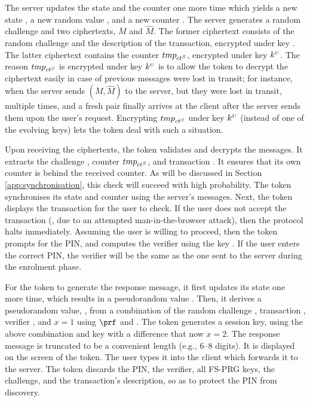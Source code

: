 The server updates the state and the counter one more time which yields a new state \VS{\state}, a new random value , and a new counter \VS{\counter}. The server generates a random challenge and two ciphertexts, $\ddot M$ and $\hat M$. The former ciphertext consists of the random challenge and the description of the transaction, encrypted under key . The latter ciphertext contains the counter ${tmp}_{{ct}^{\scriptscriptstyle S}}$, encrypted under key $k^{\scriptscriptstyle U}$. The reason ${tmp}_{{ct}^{\scriptscriptstyle S}}$ is encrypted under key $k^{\scriptscriptstyle U}$ is to allow the token to decrypt the ciphertext easily 
in case of previous messages were lost in transit; for instance, when the server sends $(\ddot M, \hat M)$ to the server, but they were lost in transit, multiple times, and a fresh pair finally arrives at the client after the server sends them upon the user's request. Encrypting ${tmp}_{{ct}^{\scriptscriptstyle S}}$ under key $k^{\scriptscriptstyle U}$ (instead of one of the evolving keys) lets the token deal with such a situation. 




Upon receiving the ciphertexts, the token validates and decrypts the messages. It extracts the challenge \VM{\nonce}, counter ${tmp}_{{ct}^{\scriptscriptstyle S}}$, and transaction \VM{\trans}. It ensures that its own counter is behind the received counter. As will be discussed in Section \ref{app:synchronisation}, this check will succeed with high probability. The token synchronises its state and counter using the server's messages. Next, the token displays the transaction for the user to check. If the user does not accept the transaction (\eg, due to an attempted man-in-the-browser attack), then the protocol halts immediately. Assuming the user is willing to proceed, then the token prompts for the PIN, and computes the verifier \VC{\verifier} using the key \VC{\salt}. If the user enters the correct PIN, the verifier will be the same as the one sent to the server during the enrolment phase.



For the token to generate the response message, it first updates its state one more time, which results in a pseudorandom value . Then, it derives a pseudorandom value, , from a combination of the random challenge \VM{\nonce}, transaction \VM{\trans}, verifier \VC{\verifier}, and $x=1$  using $\prf$ and . The token generates a session key, using the above combination and key with a difference that now $x=2$. The response message is truncated to be a convenient length (e.g., 6--8 digits). It is displayed on the screen of the token. The user types it into the client which forwards it to the server. The token discards the PIN, the verifier, all FS-PRG keys, the challenge, and the transaction's description, so as to protect the PIN from discovery. 

